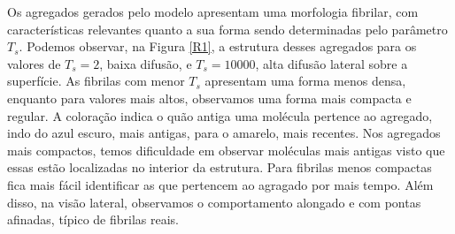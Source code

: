 \documentclass{report}
\begin{document}
        Os agregados gerados pelo modelo apresentam uma morfologia fibrilar, com características relevantes quanto a sua forma 
        sendo determinadas pelo parâmetro \(T_{s}\). Podemos observar, na Figura \ref{R1}, a estrutura desses agregados 
        para os valores de \(T_{s} = 2\), baixa difusão, e \(T_{s} = 10000\), alta difusão lateral sobre a superfície. As 
        fibrilas com menor \(T_{s}\) apresentam uma forma menos densa, enquanto para valores mais altos, observamos uma 
        forma mais compacta e regular. A coloração indica o quão antiga uma molécula pertence ao agregado, indo do azul 
        escuro, mais antigas, para o amarelo, mais recentes. Nos agregados mais compactos, temos dificuldade em observar 
        moléculas mais antigas visto que essas estão localizadas no interior da estrutura. Para fibrilas menos compactas fica 
        mais fácil identificar as que pertencem ao agragado por mais tempo. Além disso, na visão lateral, observamos o 
        comportamento alongado e com pontas afinadas, típico de fibrilas reais. 
    
\end{document}

